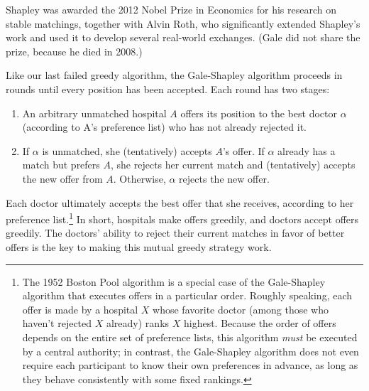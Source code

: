 Shapley was awarded the 2012 Nobel Prize in Economics for his research on stable matchings, together with Alvin Roth, who significantly extended Shapley’s work and used it to develop several real-world exchanges.
(Gale did not share the prize, because he died in 2008.)

Like our last failed greedy algorithm, the Gale-Shapley algorithm proceeds in rounds until every position has been accepted.
Each round has two stages:
\begin{enumerate}
\item An arbitrary unmatched hospital $A$ offers its position to the best doctor $\alpha$ (according to A’s preference list) who has not already rejected it.
\item If $\alpha$ is unmatched, she (tentatively) accepts $A$’s offer.
If $\alpha$ already has a match but prefers $A$, she rejects her current match and (tentatively) accepts the new offer from $A$.
Otherwise, $\alpha$ rejects the new offer.
\end{enumerate}
Each doctor ultimately accepts the best offer that she receives, according to her preference list.\footnote{The 1952 Boston Pool algorithm is a special case of the Gale-Shapley algorithm that executes offers in a particular order. Roughly speaking, each offer is made by a hospital $X$ whose favorite doctor (among those who haven’t rejected $X$ already) ranks $X$ highest. Because the order of offers depends on the entire set of preference lists, this algorithm \textit{must} be executed by a central authority; in contrast, the Gale-Shapley algorithm does not even require each participant to know their own preferences in advance, as long as they behave consistently with some fixed rankings.}
In short, hospitals make offers greedily, and doctors accept offers greedily.
The doctors’ ability to reject their current matches in favor of better offers is the key to making this mutual greedy strategy work.

